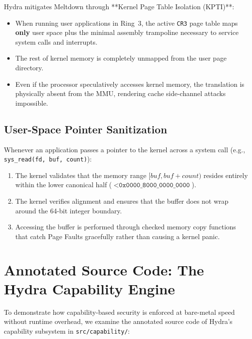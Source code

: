 Hydra mitigates Meltdown through **Kernel Page Table Isolation (KPTI)**:
\begin{itemize}
    \item When running user applications in Ring~3, the active \texttt{CR3} page table maps \textbf{only} user space plus the minimal assembly trampoline necessary to service system calls and interrupts.
    \item The rest of kernel memory is completely unmapped from the user page directory.
    \item Even if the processor speculatively accesses kernel memory, the translation is physically absent from the MMU, rendering cache side-channel attacks impossible.
\end{itemize}

\subsection{User-Space Pointer Sanitization}
Whenever an application passes a pointer to the kernel across a system call (e.g., \texttt{sys\_read(fd, buf, count)}):
\begin{enumerate}
    \item The kernel validates that the memory range $[buf, buf + count)$ resides entirely within the lower canonical half ($< \texttt{0x0000\_8000\_0000\_0000}$).
    \item The kernel verifies alignment and ensures that the buffer does not wrap around the 64-bit integer boundary.
    \item Accessing the buffer is performed through checked memory copy functions that catch Page Faults gracefully rather than causing a kernel panic.
\end{enumerate}

\section{Annotated Source Code: The Hydra Capability Engine}
\label{sec:code_capability_engine}

To demonstrate how capability-based security is enforced at bare-metal speed without runtime overhead, we examine the annotated source code of Hydra's capability subsystem in \texttt{src/capability/}:

